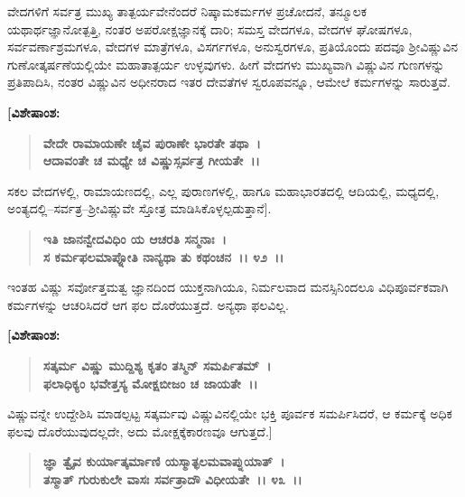 ವೇದಗಳಿಗೆ ಸರ್ವತ್ರ ಮುಖ್ಯ ತಾತ್ಪರ್ಯವೇನೆಂದರೆ ನಿಷ್ಕಾಮಕರ್ಮಗಳ ಪ್ರಚೋದನೆ, ತನ್ಮೂಲಕ ಯಥಾರ್ಥಜ್ಞಾನೋತ್ಪತ್ತಿ, ನಂತರ ಅಪರೋಕ್ಷಜ್ಞಾನಕ್ಕೆ ದಾರಿ; ಸಮಸ್ತ ವೇದಗಳೂ, ವೇದಗಳ ಘೋಷಗಳೂ, ಸರ್ವವರ್ಣಾಶ್ರಮಗಳೂ, ವೇದಗಳ ಮಾತ್ರೆಗಳೂ, ವಿಸರ್ಗಗಳೂ, ಅನುಸ್ವರಗಳೂ, ಪ್ರತಿಯೊಂದು ಪದವೂ ಶ‍್ರೀವಿಷ್ಣುವಿನ ಗುಣೋತ್ಕರ್ಷಣೆಯಲ್ಲಿಯೇ ಮಹಾತಾತ್ಪರ್ಯ ಉಳ್ಳವುಗಳು. ಹೀಗೆ ವೇದಗಳು ಮುಖ್ಯವಾಗಿ ವಿಷ್ಣುವಿನ ಗುಣಗಳನ್ನು ಪ್ರತಿಪಾದಿಸಿ, ನಂತರ ವಿಷ್ಣುವಿನ ಅಧೀನರಾದ ಇತರ ದೇವತೆಗಳ ಸ್ವರೂಪವನ್ನೂ, ಆಮೇಲೆ ಕರ್ಮಗಳನ್ನು ಸಾರುತ್ತವೆ.

\begin{flushleft}
\textbf{[ವಿಶೇಷಾಂಶ: }
\end{flushleft}

\begin{verse}
\textbf{ವೇದೇ ರಾಮಾಯಣೇ ಚೈವ ಪುರಾಣೇ ಭಾರತೇ ತಥಾ~।}\\\textbf{ಆದಾವಂತೇ ಚ ಮಧ್ಯೇ ಚ ವಿಷ್ಣುಸ್ಸರ್ವತ್ರ ಗೀಯತೇ~।।} 
\end{verse}

ಸಕಲ ವೇದಗಳಲ್ಲಿ, ರಾಮಾಯಣದಲ್ಲಿ, ಎಲ್ಲ ಪುರಾಣಗಳಲ್ಲಿ, ಹಾಗೂ ಮಹಾಭಾರತ\-ದಲ್ಲಿ ಆದಿಯಲ್ಲಿ, ಮಧ್ಯದಲ್ಲಿ, ಅಂತ್ಯದಲ್ಲಿ–ಸರ್ವತ್ರ–ಶ‍್ರೀವಿಷ್ಣುವೇ ಸ್ತೋತ್ರ ಮಾಡಿಸಿ\break ಕೊಳ್ಳಲ್ಪಡುತ್ತಾನೆ].

\begin{verse}
\textbf{ಇತಿ ಜಾನನ್ವೇದವಿಧಿಂ ಯ ಆಚರತಿ ಸನ್ಮನಾಃ~।}\\\textbf{ಸ ಕರ್ಮಫಲಮಾಪ್ನೋತಿ ನಾನ್ಯಥಾ ತು ಕಥಂಚನ~।। ೪೨~।।}
\end{verse}

ಇಂತಹ ವಿಷ್ಣು ಸರ್ವೋತ್ತಮತ್ವ ಜ್ಞಾನದಿಂದ ಯುಕ್ತನಾಗಿಯೂ, ನಿರ್ಮಲವಾದ ಮನಸ್ಸಿನಿಂದಲೂ ವಿಧಿಪೂರ್ವಕವಾಗಿ ಕರ್ಮಗಳನ್ನು ಆಚರಿಸಿದರೆ ಆಗ ಫಲ ದೊರೆಯುತ್ತದೆ. ಅನ್ಯಥಾ ಫಲವಿಲ್ಲ. 

\newpage

\begin{flushleft}
\textbf{[ವಿಶೇಷಾಂಶ:}
\end{flushleft}

\begin{verse}
\textbf{ಸತ್ಕರ್ಮ ವಿಷ್ಣು ಮುದ್ದಿಶ್ಯ ಕೃತಂ ತಸ್ಮಿನ್ ಸಮರ್ಪಿತಮ್~।}\\\textbf{ಫಲಾಧಿಕ್ಯಂ ಭವೇತ್ತಸ್ಯ ಮೋಕ್ಷಬೀಜಂ ಚ ಜಾಯತೇ~।।} 
\end{verse}

ವಿಷ್ಣುವನ್ನೇ ಉದ್ದೇಶಿಸಿ ಮಾಡಲ್ಪಟ್ಟ ಸತ್ಕರ್ಮವು ವಿಷ್ಣುವಿನಲ್ಲಿಯೇ ಭಕ್ತಿ ಪೂರ್ವಕ ಸಮರ್ಪಿಸಿದರೆ, ಆ ಕರ್ಮಕ್ಕೆ ಅಧಿಕ ಫಲವು ದೊರೆಯುವುದಲ್ಲದೇ, ಅದು ಮೋಕ್ಷಕ್ಕೆ\break ಕಾರಣವೂ ಆಗುತ್ತದೆ.]

\begin{verse}
\textbf{ಜ್ಞಾ ತ್ವೈವ ಕುರ್ಯಾತ್ಕರ್ಮಾಣಿ ಯಸ್ಮಾತ್ಫಲಮವಾಪ್ನುಯಾತ್~।}\\\textbf{ತಸ್ಮಾತ್ ಗುರುಕುಲೇ ವಾಸಃ ಸರ್ವತ್ರಾದೌ ವಿಧೀಯತೇ~।। ೪೩~।।}
\end{verse}

